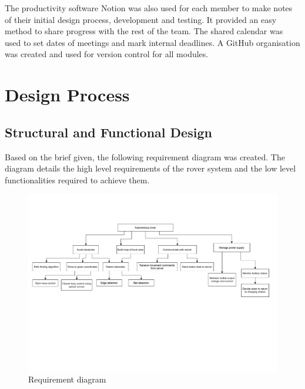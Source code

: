 \documentclass[10pt,twoside]{article}
\begin{document}
The productivity software Notion was also used for each member to make notes of their initial design process, development and testing. It provided an easy method to share progress with the rest of the team. The shared calendar was used to set dates of meetings and mark internal deadlines. A GitHub organisation was created and used for version control for all modules.

\newpage
\section{Design Process}
\subsection{Structural and Functional Design}

Based on the brief given, the following requirement diagram was created. The diagram details the high level requirements of the rover system and the low level functionalities required to achieve them.

\begin{figure}[hbt]
    \centering
    \includegraphics[scale = 0.4, trim={0cm 8cm 0cm 3cm},clip]{Requirements.pdf}
    \caption{Requirement diagram}
    \label{fig:RequirementDiagram}
\end{figure}
\end{document}
